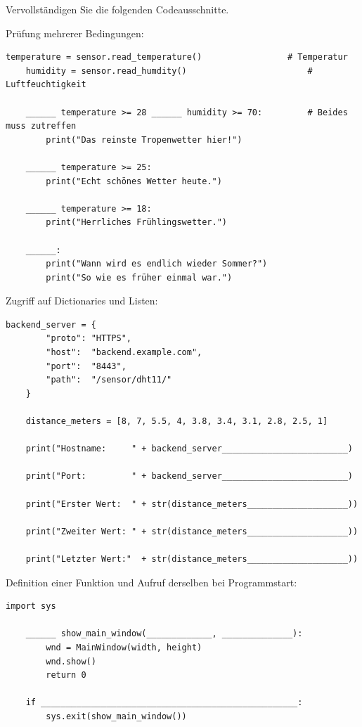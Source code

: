 \clearpage

Vervollständigen Sie die folgenden Codeausschnitte.

\bigskip
\teilaufgabe
Prüfung mehrerer Bedingungen:

\begin{Verbatim}[gobble=4]
    temperature = sensor.read_temperature()                 # Temperatur
    humidity = sensor.read_humdity()                        # Luftfeuchtigkeit

    ______ temperature >= 28 ______ humidity >= 70:         # Beides muss zutreffen
        print("Das reinste Tropenwetter hier!")

    ______ temperature >= 25:
        print("Echt schönes Wetter heute.")

    ______ temperature >= 18:
        print("Herrliches Frühlingswetter.")

    ______:
        print("Wann wird es endlich wieder Sommer?")
        print("So wie es früher einmal war.")

\end{Verbatim}

\teilaufgabe
Zugriff auf Dictionaries und Listen:

\begin{Verbatim}[gobble=4]
    backend_server = {
        "proto": "HTTPS",
        "host":  "backend.example.com",
        "port":  "8443",
        "path":  "/sensor/dht11/"
    }

    distance_meters = [8, 7, 5.5, 4, 3.8, 3.4, 3.1, 2.8, 2.5, 1]

    print("Hostname:     " + backend_server_________________________)

    print("Port:         " + backend_server_________________________)

    print("Erster Wert:  " + str(distance_meters____________________))

    print("Zweiter Wert: " + str(distance_meters____________________))

    print("Letzter Wert:"  + str(distance_meters____________________))
\end{Verbatim}

\clearpage
\teilaufgabe
Definition einer Funktion und Aufruf derselben bei Programmstart:

\begin{Verbatim}[gobble=4]
    import sys

    ______ show_main_window(_____________, ______________):
        wnd = MainWindow(width, height)
        wnd.show()
        return 0

    if ___________________________________________________:
        sys.exit(show_main_window())
\end{Verbatim}

